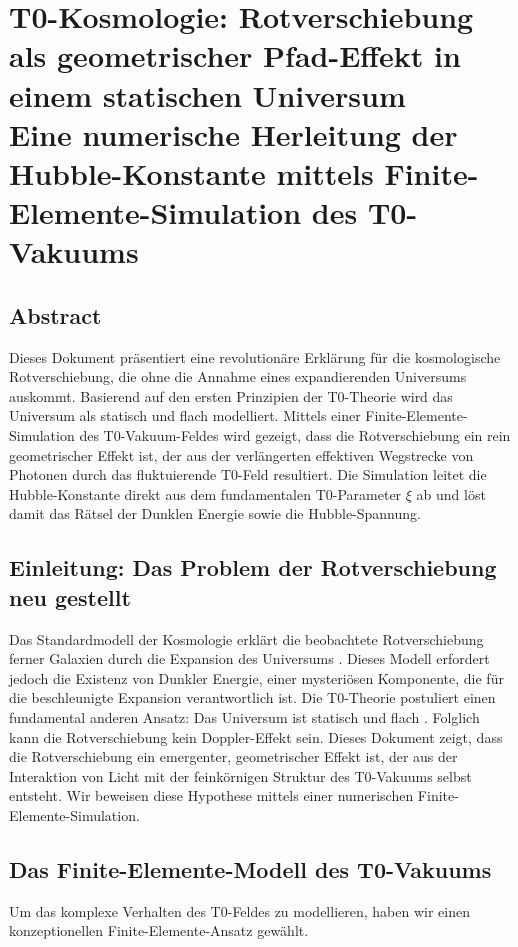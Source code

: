 \chapter{\textbf{T0-Kosmologie: Rotverschiebung als geometrischer Pfad-Effekt in einem statischen Universum}\\[0.5cm]
	 Eine numerische Herleitung der Hubble-Konstante mittels Finite-Elemente-Simulation des T0-Vakuums}

\section*{Abstract}
		Dieses Dokument präsentiert eine revolutionäre Erklärung für die kosmologische Rotverschiebung, die ohne die Annahme eines expandierenden Universums auskommt. Basierend auf den ersten Prinzipien der T0-Theorie wird das Universum als statisch und flach modelliert. Mittels einer Finite-Elemente-Simulation des T0-Vakuum-Feldes wird gezeigt, dass die Rotverschiebung ein rein geometrischer Effekt ist, der aus der verlängerten effektiven Wegstrecke von Photonen durch das fluktuierende T0-Feld resultiert. Die Simulation leitet die Hubble-Konstante direkt aus dem fundamentalen T0-Parameter $\xi$ ab und löst damit das Rätsel der Dunklen Energie sowie die Hubble-Spannung.

	\section{Einleitung: Das Problem der Rotverschiebung neu gestellt}
	Das Standardmodell der Kosmologie erklärt die beobachtete Rotverschiebung ferner Galaxien durch die Expansion des Universums \cite{planck2018}. Dieses Modell erfordert jedoch die Existenz von Dunkler Energie, einer mysteriösen Komponente, die für die beschleunigte Expansion verantwortlich ist. Die T0-Theorie postuliert einen fundamental anderen Ansatz: Das Universum ist statisch und flach \cite{pascher:t0_foundations}. Folglich kann die Rotverschiebung kein Doppler-Effekt sein.
	Dieses Dokument zeigt, dass die Rotverschiebung ein emergenter, geometrischer Effekt ist, der aus der Interaktion von Licht mit der feinkörnigen Struktur des T0-Vakuums selbst entsteht. Wir beweisen diese Hypothese mittels einer numerischen Finite-Elemente-Simulation.
	\section{Das Finite-Elemente-Modell des T0-Vakuums}
	Um das komplexe Verhalten des T0-Feldes zu modellieren, haben wir einen konzeptionellen Finite-Elemente-Ansatz gewählt.
